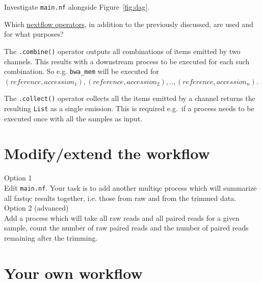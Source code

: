 \begin{questions}
Investigate \texttt{main.nf} alongside Figure~\ref{fig:dag}. 

Which \href{https://www.nextflow.io/docs/latest/operator.html}{nextflow operators}, in addition to the previously discussed, are used and for what purposes? 

\begin{answer}
The \texttt{.combine()} operator outputs all combinations of items emitted by two channels. This results with a downstream process to be executed for each such combination. So e.g. \texttt{bwa\_mem} will be executed for\\ $(reference, accession_1),(reference, accession_2),..,(reference, accession_n)$.

The \texttt{.collect()} operator collects all the items emitted by a channel returns the resulting \texttt{List} as a single emission. This is required e.g.\ if a process needs to be executed once with all the samples as input.
\end{answer}

\end{questions}


\section{Modify/extend the workflow}

\begin{steps}


Option 1\\
Edit \texttt{main.nf}. Your task is to add another multiqc process which will summarize all fastqc results together, i.e. those from raw and from the trimmed data. \\

Option 2 (advanced) \\
Add a process which will take all raw reads and all paired reads for a given sample, count the number of raw paired reads and the number of paired reads remaining after the trimming.


\end{steps}

\section{Your own workflow}

